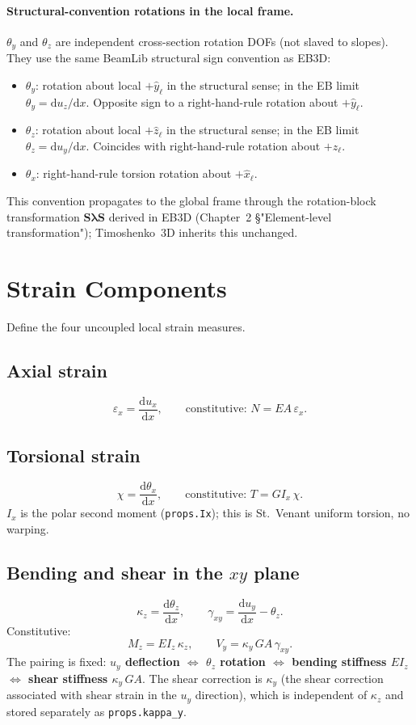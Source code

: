\documentclass[11pt,a4paper]{article}
\newcommand{\dd}{\mathrm{d}}
\newcommand{\bmath}[1]{\boldsymbol{#1}}
\newcommand{\Sdiag}{\bmath{S}}
\newcommand{\lam}{\bmath{\lambda}}
\begin{document}
\paragraph{Structural-convention rotations in the local frame.}
$\theta_y$ and $\theta_z$ are independent cross-section rotation DOFs (not slaved to slopes). They use the same BeamLib structural sign convention as EB3D:
\begin{itemize}
    \item $\theta_y$: rotation about local $+\hat{y}_\ell$ in the structural sense; in the EB limit $\theta_y = \dd u_z/\dd x$. Opposite sign to a right-hand-rule rotation about $+\hat{y}_\ell$.
    \item $\theta_z$: rotation about local $+\hat{z}_\ell$ in the structural sense; in the EB limit $\theta_z = \dd u_y/\dd x$. Coincides with right-hand-rule rotation about $+\hat{z}_\ell$.
    \item $\theta_x$: right-hand-rule torsion rotation about $+\hat{x}_\ell$.
\end{itemize}
This convention propagates to the global frame through the rotation-block transformation $\Sdiag\lam\Sdiag$ derived in EB3D (Chapter~2 \S"Element-level transformation"); Timoshenko~3D inherits this unchanged.

\section{Strain Components}

Define the four uncoupled local strain measures.

\subsection{Axial strain}
\[
\varepsilon_x = \frac{\dd u_x}{\dd x},
\qquad
\text{constitutive: } N = EA\,\varepsilon_x.
\]

\subsection{Torsional strain}
\[
\chi = \frac{\dd \theta_x}{\dd x},
\qquad
\text{constitutive: } T = G I_x\,\chi.
\]
$I_x$ is the polar second moment (\texttt{props.Ix}); this is St.\ Venant uniform torsion, no warping.

\subsection{Bending and shear in the $xy$ plane}
\[
\kappa_z = \frac{\dd \theta_z}{\dd x}, \qquad \gamma_{xy} = \frac{\dd u_y}{\dd x} - \theta_z.
\]
Constitutive:
\[
M_z = E I_z\,\kappa_z, \qquad V_y = \kappa_y\,GA\,\gamma_{xy}.
\]
The pairing is fixed: \textbf{$u_y$ deflection $\Leftrightarrow$ $\theta_z$ rotation $\Leftrightarrow$ bending stiffness $E I_z$ $\Leftrightarrow$ shear stiffness $\kappa_y\,GA$}. The shear correction is $\kappa_y$ (the shear correction associated with shear strain in the $u_y$ direction), which is independent of $\kappa_z$ and stored separately as \texttt{props.kappa\_y}.
\end{document}
